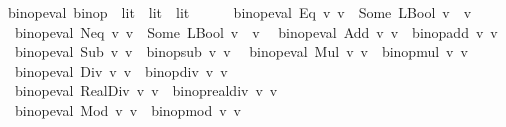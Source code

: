 \begin{isabellebody}
\isanewline
{}\isamarkupfalse%
\ binop{\isacharunderscore}{\kern0pt}eval\ {\isacharcolon}{\kern0pt}{\isacharcolon}{\kern0pt}{\isachardoublequoteopen}binop\ {\isasymRightarrow}\ lit\ {\isasymRightarrow}\ lit\ {\isasymrightharpoonup}\ lit{\isachardoublequoteclose}\isanewline
\ \ \isanewline
\ \ \ {\isachardoublequoteopen}binop{\isacharunderscore}{\kern0pt}eval\ Eq\ v{}\ v{}\ {\isacharequal}{\kern0pt}\ Some\ {\isacharparenleft}{\kern0pt}LBool\ {\isacharparenleft}{\kern0pt}v{}\ {\isacharequal}{\kern0pt}\ v{}{\isacharparenright}{\kern0pt}{\isacharparenright}{\kern0pt}{\isachardoublequoteclose}\isanewline
\ {\isacharbar}{\kern0pt}\ {\isachardoublequoteopen}binop{\isacharunderscore}{\kern0pt}eval\ Neq\ v{}\ v{}\ {\isacharequal}{\kern0pt}\ Some\ {\isacharparenleft}{\kern0pt}LBool\ {\isacharparenleft}{\kern0pt}v{}\ {\isasymnoteq}\ v{}{\isacharparenright}{\kern0pt}{\isacharparenright}{\kern0pt}{\isachardoublequoteclose}\isanewline
\ {\isacharbar}{\kern0pt}\ {\isachardoublequoteopen}binop{\isacharunderscore}{\kern0pt}eval\ Add\ v{}\ v{}\ {\isacharequal}{\kern0pt}\ binop{\isacharunderscore}{\kern0pt}add\ v{}\ v{}{\isachardoublequoteclose}\isanewline
\ {\isacharbar}{\kern0pt}\ {\isachardoublequoteopen}binop{\isacharunderscore}{\kern0pt}eval\ Sub\ v{}\ v{}\ {\isacharequal}{\kern0pt}\ binop{\isacharunderscore}{\kern0pt}sub\ v{}\ v{}{\isachardoublequoteclose}\isanewline
\ {\isacharbar}{\kern0pt}\ {\isachardoublequoteopen}binop{\isacharunderscore}{\kern0pt}eval\ Mul\ v{}\ v{}\ {\isacharequal}{\kern0pt}\ binop{\isacharunderscore}{\kern0pt}mul\ v{}\ v{}{\isachardoublequoteclose}\isanewline
\ {\isacharbar}{\kern0pt}\ {\isachardoublequoteopen}binop{\isacharunderscore}{\kern0pt}eval\ Div\ v{}\ v{}\ {\isacharequal}{\kern0pt}\ binop{\isacharunderscore}{\kern0pt}div\ v{}\ v{}{\isachardoublequoteclose}\isanewline
\ {\isacharbar}{\kern0pt}\ {\isachardoublequoteopen}binop{\isacharunderscore}{\kern0pt}eval\ RealDiv\ v{}\ v{}\ {\isacharequal}{\kern0pt}\ binop{\isacharunderscore}{\kern0pt}real{\isacharunderscore}{\kern0pt}div\ v{}\ v{}{\isachardoublequoteclose}\isanewline
\ {\isacharbar}{\kern0pt}\ {\isachardoublequoteopen}binop{\isacharunderscore}{\kern0pt}eval\ Mod\ v{}\ v{}\ {\isacharequal}{\kern0pt}\ binop{\isacharunderscore}{\kern0pt}mod\ v{}\ v{}{\isachardoublequoteclose}\isanewline

\end{isabellebody}

